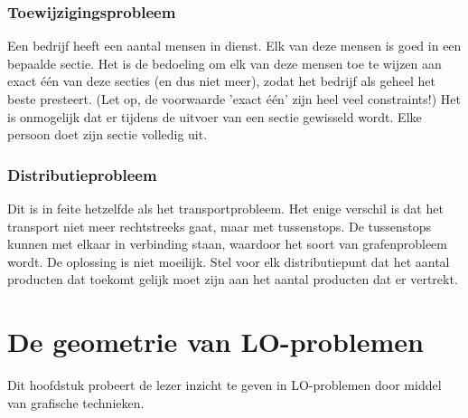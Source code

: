 \documentclass[10pt]{article}
\begin{document}
\subsubsection{Toewijzigingsprobleem}
Een bedrijf heeft een aantal mensen in dienst. Elk van deze mensen is goed in een bepaalde sectie. Het is de bedoeling om elk van deze mensen toe te wijzen aan exact \'e\'en van deze secties (en dus niet meer), zodat het bedrijf als geheel het beste presteert. (Let op, de voorwaarde 'exact \'e\'en' zijn heel veel constraints!) Het is onmogelijk dat er tijdens de uitvoer van een sectie gewisseld wordt. Elke persoon doet zijn sectie volledig uit.
\subsubsection{Distributieprobleem}
Dit is in feite hetzelfde als het transportprobleem. Het enige verschil is dat het transport niet meer rechtstreeks gaat, maar met tussenstops. De tussenstops kunnen met elkaar in verbinding staan, waardoor het soort van grafenprobleem wordt. De oplossing is niet moeilijk. Stel voor elk distributiepunt dat het aantal producten dat toekomt gelijk moet zijn aan het aantal producten dat er vertrekt.
\section{De geometrie van LO-problemen}
Dit hoofdstuk probeert de lezer inzicht te geven in LO-problemen door middel van grafische technieken.
\end{document}
